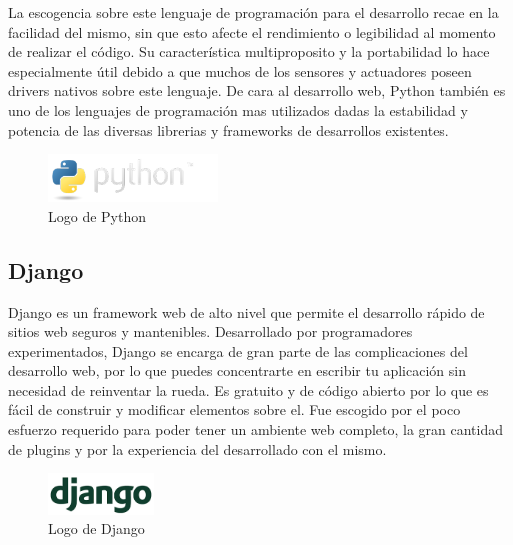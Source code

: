 La escogencia sobre este lenguaje de programación para el desarrollo recae en la facilidad del mismo, sin que esto afecte el rendimiento o legibilidad al momento de realizar el código. Su característica multiproposito y la portabilidad lo hace especialmente útil debido a que muchos de los sensores y actuadores poseen drivers nativos sobre este lenguaje. De cara al desarrollo web, Python también es uno de los lenguajes de programación mas utilizados dadas la estabilidad y potencia de las diversas librerias y frameworks de desarrollos existentes.

\begin{figure}[ht]
\centering
\includegraphics[width=0.4\textwidth]{Figuras/python-logo.png}
\caption{\label{fig:python-logo}Logo de Python}
\vspace*{-10pt}
\end{figure}

\subsection{Django}
Django es un framework web de alto nivel que permite el desarrollo rápido de sitios web seguros y mantenibles. Desarrollado por programadores experimentados, Django se encarga de gran parte de las complicaciones del desarrollo web, por lo que puedes concentrarte en escribir tu aplicación sin necesidad de reinventar la rueda. Es gratuito y de código abierto por lo que es fácil de construir y modificar elementos sobre el. Fue escogido por el poco esfuerzo requerido para poder tener un ambiente web completo, la gran cantidad de plugins y por la experiencia del desarrollado con el mismo.

\begin{figure}[ht]
\centering
\includegraphics[width=0.25\textwidth]{Figuras/django.png}
\caption{\label{fig:django-logo}Logo de Django}
\vspace*{-10pt}
\end{figure} 

